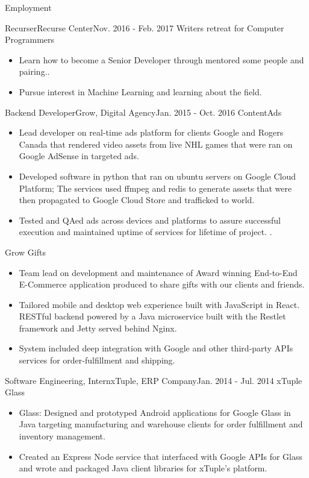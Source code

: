 \documentclass[]{mcdowellcv}
\begin{document}
	\makeheader

	\begin{cvsection}{Employment}

		\begin{cvsubsection}{Recurser}{Recurse Center}{Nov. 2016 - Feb. 2017}
			Writers retreat for Computer Programmers
			\begin{itemize}
				\item Learn how to become a Senior Developer through mentored some people and pairing..
				\item Pursue interest in Machine Learning and learning about the field.
			\end{itemize}
		\end{cvsubsection}

		\begin{cvsubsection}{Backend Developer}{Grow, Digital Agency}{Jan. 2015 - Oct. 2016}
			ContentAds
			\begin{itemize}
				\item Lead developer on real-time ads platform for clients Google and Rogers Canada that rendered video assets from live NHL games that were ran on Google AdSense in targeted ads.
				\item Developed software in python that ran on ubuntu servers on Google Cloud Platform; The services used ffmpeg and redis to generate assets that were then propagated to Google Cloud Store and trafficked to world.
				\item Tested and QAed ads across devices and platforms to assure successful execution and maintained uptime of services for lifetime of project. .
			\end{itemize}
			Grow Gifts
			\begin{itemize}
				\item Team lead on development and maintenance of Award winning End-to-End E-Commerce application produced to share gifts with our clients and friends.
				\item Tailored mobile and desktop web experience built with JavaScript in React. RESTful backend powered by a Java microservice built with the Restlet framework and Jetty served behind Nginx.
				\item System included deep integration with Google and other third-party APIs services for order-fulfillment and shipping.
			\end{itemize}
		\end{cvsubsection}

		\begin{cvsubsection}{Software Engineering, Intern}{xTuple, ERP Company}{Jan. 2014 - Jul. 2014}
			xTuple Glass
			\begin{itemize}
				\item Glass: Designed and prototyped Android applications for Google Glass in Java targeting manufacturing and warehouse clients for order fulfillment and inventory management.
				\item Created an Express Node service that interfaced with Google APIs for Glass and wrote and packaged Java client libraries for xTuple’s platform.
			\end{itemize}
		\end{cvsubsection}


\end{cvsection}
\end{document}
